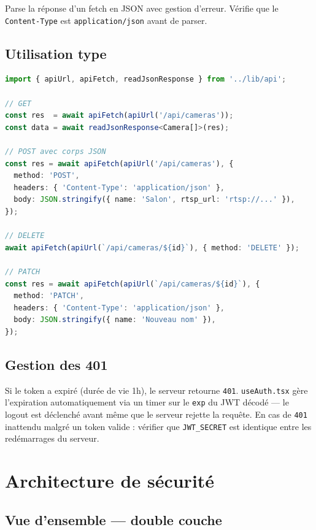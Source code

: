 \documentclass[12pt,a4paper]{article}
\begin{document}
Parse la réponse d'un fetch en JSON avec gestion d'erreur.
Vérifie que le \texttt{Content-Type} est \texttt{application/json} avant de parser.

\subsection{Utilisation type}

\begin{lstlisting}[language=typescript]
import { apiUrl, apiFetch, readJsonResponse } from '../lib/api';

// GET
const res  = await apiFetch(apiUrl('/api/cameras'));
const data = await readJsonResponse<Camera[]>(res);

// POST avec corps JSON
const res = await apiFetch(apiUrl('/api/cameras'), {
  method: 'POST',
  headers: { 'Content-Type': 'application/json' },
  body: JSON.stringify({ name: 'Salon', rtsp_url: 'rtsp://...' }),
});

// DELETE
await apiFetch(apiUrl(`/api/cameras/${id}`), { method: 'DELETE' });

// PATCH
const res = await apiFetch(apiUrl(`/api/cameras/${id}`), {
  method: 'PATCH',
  headers: { 'Content-Type': 'application/json' },
  body: JSON.stringify({ name: 'Nouveau nom' }),
});
\end{lstlisting}

\subsection{Gestion des 401}

Si le token a expiré (durée de vie 1h), le serveur retourne \texttt{401}.
\texttt{useAuth.tsx} gère l'expiration automatiquement via un timer sur le \texttt{exp}
du JWT décodé — le logout est déclenché avant même que le serveur rejette la requête.
En cas de \texttt{401} inattendu malgré un token valide : vérifier que
\texttt{JWT\_SECRET} est identique entre les redémarrages du serveur.

\section{Architecture de sécurité}

\subsection{Vue d'ensemble — double couche}
\end{document}
